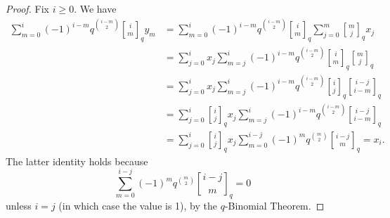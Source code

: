 \documentclass[10pt,a4paper]{amsart}
\newcommand{\qbinom}[2]{\genfrac{[}{]}{0pt}{}{#1}{#2}}
\begin{document}
\begin{proof}
    Fix $i \ge 0$. We have
    \allowdisplaybreaks
    \[
    \begin{split}
    \sum_{m=0}^i (-1)^{i-m} q^{\binom{i-m}{2}} \qbinom{i}{m}_q y_m &= \sum_{m=0}^i (-1)^{i-m} q^{\binom{i-m}{2}} \qbinom{i}{m}_q \sum_{j=0}^m \qbinom{m}{j}_q x_j \\
    &= \sum_{j=0}^i x_j \sum_{m=j}^i (-1)^{i-m} q^{\binom{i-m}{2}} \qbinom{i}{m}_q  \qbinom{m}{j}_q \\
    &= \sum_{j=0}^i x_j \sum_{m=j}^i (-1)^{i-m} q^{\binom{i-m}{2}} \qbinom{i}{j}_q \qbinom{i-j}{i-m}_q \\
    &= \sum_{j=0}^i \qbinom{i}{j}_q x_j \sum_{m=j}^i (-1)^{i-m} q^{\binom{i-m}{2}}  \qbinom{i-j}{i-m}_q \\
    &= \sum_{j=0}^i \qbinom{i}{j}_q x_j \sum_{m=0}^{i-j} (-1)^m q^{\binom{m}{2}}  \qbinom{i-j}{m}_q =  x_i.
    \end{split}
    \]
    The latter identity holds because
    \[
    \sum_{m=0}^{i-j} (-1)^m q^{\binom{m}{2}}  \qbinom{i-j}{m}_q = 0
    \]
    unless $i = j$ (in which case the value is 1), by the $q$-Binomial Theorem.
\end{proof}
\end{document}
